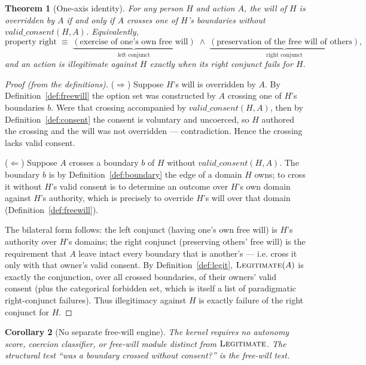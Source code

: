 \documentclass[11pt]{article}
\newtheorem{theorem}{Theorem}
\newtheorem{corollary}[theorem]{Corollary}
\newcommand{\Legit}{\textsc{Legitimate}}
\begin{document}
\begin{theorem}[One-axis identity]
\label{thm:oneaxis}
For any person $H$ and action $A$, the will of $H$ is overridden by $A$ \emph{if and only if}
$A$ crosses one of $H$'s boundaries without $\mathit{valid\_consent}(H,A)$. Equivalently,
\[
\text{property right} \;\equiv\; \underbrace{(\text{exercise of one's own free will})}_{\text{left conjunct}} \;\wedge\; \underbrace{(\text{preservation of the free will of others})}_{\text{right conjunct}},
\]
and an action is illegitimate against $H$ exactly when its right conjunct fails for $H$.
\end{theorem}

\begin{proof}[Proof (from the definitions)]
($\Rightarrow$) Suppose $H$'s will is overridden by $A$. By Definition~\ref{def:freewill} the
option set was constructed by $A$ crossing one of $H$'s boundaries $b$. Were that crossing
accompanied by $\mathit{valid\_consent}(H,A)$, then by Definition~\ref{def:consent} the
consent is voluntary and uncoerced, so $H$ authored the crossing and the will was not
overridden --- contradiction. Hence the crossing lacks valid consent.

($\Leftarrow$) Suppose $A$ crosses a boundary $b$ of $H$ without $\mathit{valid\_consent}(H,A)$.
The boundary $b$ is by Definition~\ref{def:boundary} the edge of a domain $H$ owns; to cross
it without $H$'s valid consent is to determine an outcome over $H$'s own domain against $H$'s
authority, which is precisely to override $H$'s will over that domain
(Definition~\ref{def:freewill}).

The bilateral form follows: the left conjunct (having one's own free will) is $H$'s authority
over $H$'s domains; the right conjunct (preserving others' free will) is the requirement that
$A$ leave intact every boundary that is another's --- i.e. cross it only with that owner's
valid consent. By Definition~\ref{def:legit}, $\Legit(A)$ is exactly the conjunction, over all
crossed boundaries, of their owners' valid consent (plus the categorical forbidden set, which
is itself a list of paradigmatic right-conjunct failures). Thus illegitimacy against $H$ is
exactly failure of the right conjunct for $H$.
\end{proof}

\begin{corollary}[No separate free-will engine]
\label{cor:subtractive}
The kernel requires no autonomy score, coercion classifier, or free-will module distinct from
$\Legit$. The structural test ``was a boundary crossed without consent?'' \emph{is} the
free-will test.
\end{corollary}
\end{document}
